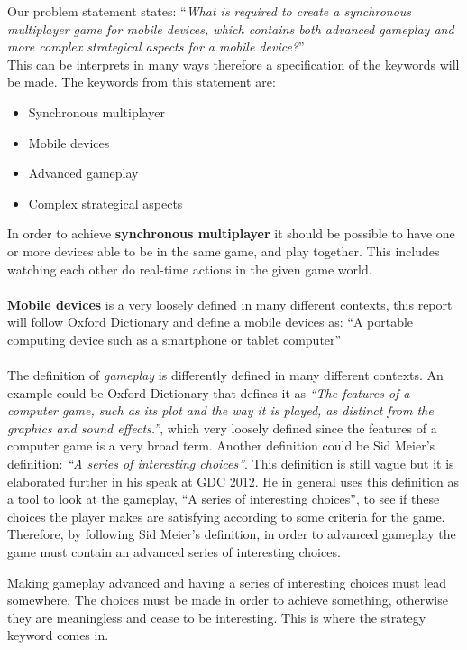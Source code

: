 Our problem statement states: ``\textit{What is required to create a synchronous multiplayer game for mobile devices, which contains both advanced
gameplay and more complex strategical aspects for a mobile device?}''\\
This can be interprets in many ways therefore a specification of the keywords will be made.
The keywords from this statement are:
\begin{itemize}
\item Synchronous multiplayer
\item Mobile devices
\item Advanced gameplay
\item Complex strategical aspects
\end{itemize}
In order to achieve \textbf{synchronous multiplayer} it should be possible to have one or more devices able to be in the same game, and play together. This includes watching each other do real-time actions in the given game world.\\\\
\textbf{Mobile devices} is a very loosely defined in many different contexts, this report will follow Oxford Dictionary and define a mobile devices as: ``A portable computing device such as a smartphone or tablet computer''\cite{mobileOx}\\\\
The definition of \textit{gameplay} is differently defined in many different contexts. An example could be Oxford Dictionary that defines it as \textit{``The features of a computer game, such as its plot and the way it is played, as distinct from the graphics and sound effects.''}\cite{gameplayOx}, which very loosely defined since the features of a computer game is a very broad term. Another definition could be Sid Meier's definition: \textit{``A series of interesting choices''}\cite{GDC2012}. This definition is still vague but it is elaborated further in his speak at GDC 2012.\cite{GDC2012}
He in general uses this definition as a tool to look at the gameplay, ``A series of interesting choices'', to see if these choices the player makes are satisfying according to some criteria for the game.\\
Therefore, by following Sid Meier's definition, in order to advanced gameplay the game must contain an advanced series of interesting choices.

Making gameplay advanced and having a series of interesting choices must lead somewhere.
The choices must be made in order to achieve something, otherwise they are meaningless and cease to be interesting.
This is where the strategy keyword comes in.\\\\

